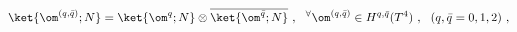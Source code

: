 \begin{equation}
\ket{\om^{(q,\bar{q})};N}= \ket{\om^q; N }\otimes
\overline{\ket{\om^{\bar{q}};N}} ~, ~~{}^{\forall}\om^{(q,\bar{q})} \in 
H^{q,\bar{q}} (T^4) ~, ~~(q,\bar{q}=0,1,2) ~,
\end{equation}

